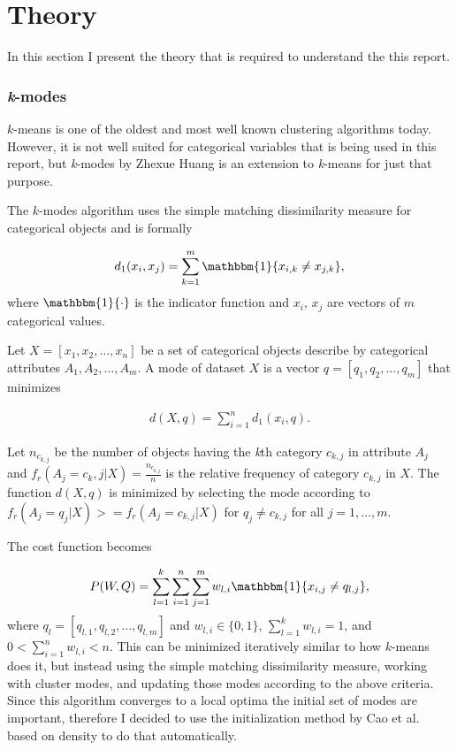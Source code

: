 \documentclass[result.tex]{subfiles}
\begin{document}
\section*{\centering Theory}

In this section I present the theory that is required to understand the this report.

\subsubsection*{\textit{k}-modes}

$k$-means is one of the oldest and most well known clustering algorithms today. However, it is not well suited for categorical variables that is being used in this report, but \textit{k}-modes by Zhexue Huang \cite{huang1998extensions} is an extension to \textit{k}-means for just that purpose.

The $k$-modes algorithm uses the simple matching dissimilarity measure for categorical objects and is formally

\begin{align*}
d_1(x_i, x_j) = \sum_{k=1}^{m}  \mathbbm{1} \{ x_{i,k} \neq x_{j,k} \},
\end{align*}
where $\mathbbm{1} \{ \cdot \}$ is the indicator function and $x_i$, $x_j$ are vectors of $m$ categorical values.

Let $X = \left[ x_1, x_2, \ldots, x_n \right]$ be a set of categorical objects describe by categorical attributes $A_1, A_2, \ldots, A_m$. A mode of dataset $X$ is a vector $q = \left[ q_1, q_2, \ldots, q_m \right]$ that minimizes

\begin{align*}
d(X, q) = \sum_{i=1}^{n} d_1(x_i, q).
\end{align*}

Let $n_{c_{k, j}}$ be the number of objects having the \textit{k}th category $c_{k,j}$ in attribute $A_j$ and $f_r(A_j = c_k,j | X) = \frac{n_{c_{k,j}}}{n}$ is the relative frequency of category $c_{k,j}$ in $X$. The function $d(X, q)$ is minimized by selecting the mode according to $f_r(A_j = q_j | X) >= f_r(A_j = c_{k,j} | X)$ for $q_j \neq c_{k,j}$ for all $j = 1, \ldots, m$.

The cost function becomes

\begin{align*}
P(W, Q) = \sum_{l=1}^{k} \sum_{i=1}^{n} \sum_{j=1}^{m} w_{l,i} \mathbbm{1} \{ x_{i,j} \neq q_{l, j} \},
\end{align*}
where $q_{l} = \left[ q_{l,1}, q_{l,2}, \ldots, q_{l,m} \right]$ and $w_{l,i} \in \{ 0, 1 \}$, $\sum_{l=1}^{k} w_{l,i} = 1$, and $0 < \sum_{i=1}^{n} w_{l,i} < n$. This can be minimized iteratively similar to how $k$-means does it, but instead using the simple matching dissimilarity measure, working with cluster modes, and updating those modes according to the above criteria. Since this algorithm converges to a local optima the initial set of modes are important, therefore I decided to use the initialization method by Cao et al. \cite{cao2009new} based on density to do that automatically.
\end{document}

